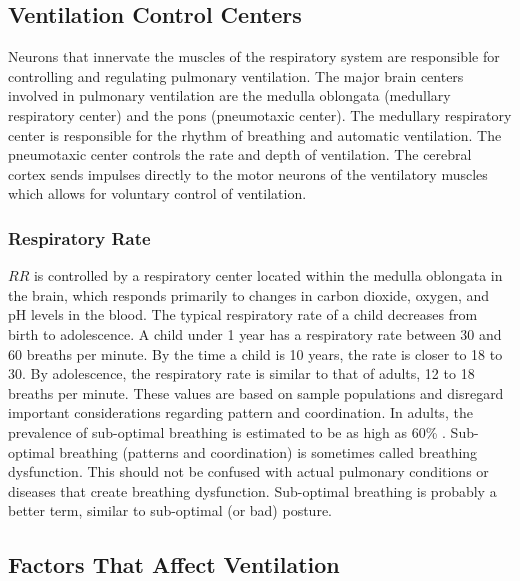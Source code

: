 \subsection{Ventilation Control Centers}

Neurons that innervate the muscles of the respiratory system are responsible for controlling and regulating pulmonary ventilation. The major brain centers involved in pulmonary ventilation are the medulla oblongata (medullary respiratory center) and the pons (pneumotaxic center). The medullary respiratory center is responsible for the rhythm of breathing and automatic ventilation. The pneumotaxic center controls the rate and depth of ventilation. The cerebral cortex sends impulses directly to the motor neurons of the ventilatory muscles which allows for voluntary control of ventilation.


\subsubsection{Respiratory Rate}
$RR$ is controlled by a respiratory center located within the medulla oblongata in the brain, which responds primarily to changes in carbon dioxide, oxygen, and pH levels in the blood. The typical respiratory rate of a child decreases from birth to adolescence. A child under 1 year has a respiratory rate between 30 and 60 breaths per minute. By the time a child is 10 years, the rate is closer to 18 to 30. By adolescence, the respiratory rate is similar to that of adults, 12 to 18 breaths per minute. These values are based on sample populations and disregard important considerations regarding pattern and coordination. In adults, the prevalence of sub-optimal breathing is estimated to be as high as 60\% \cite{}. Sub-optimal breathing (patterns and coordination) is sometimes called breathing dysfunction. This should not be confused with actual pulmonary conditions or diseases that create breathing dysfunction. Sub-optimal breathing is probably a better term, similar to sub-optimal (or bad) posture. 


\subsection{Factors That Affect Ventilation} 

